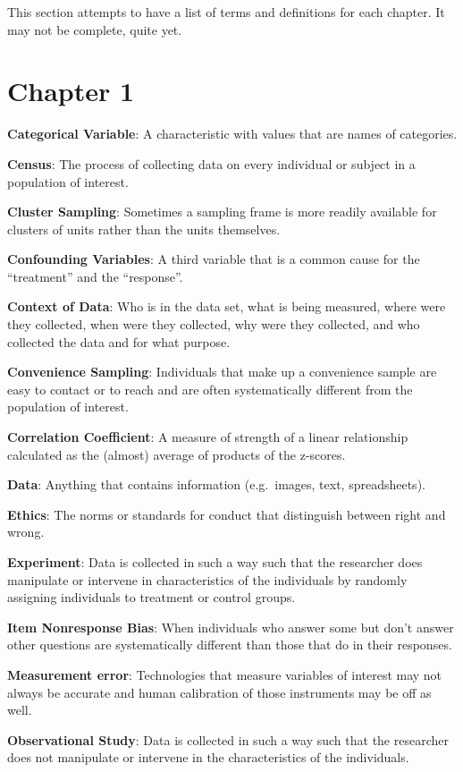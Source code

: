 \documentclass[
]{book}
\begin{document}
This section attempts to have a list of terms and definitions for each chapter. It may not be complete, quite yet.

\section{Chapter 1}\label{chapter-1}

\textbf{Categorical Variable}: A characteristic with values that are names of categories.

\textbf{Census}: The process of collecting data on every individual or subject in a population of interest.

\textbf{Cluster Sampling}: Sometimes a sampling frame is more readily available for clusters of units rather than the units themselves.

\textbf{Confounding Variables}: A third variable that is a common cause for the ``treatment'' and the ``response''.

\textbf{Context of Data}: Who is in the data set, what is being measured, where were they collected, when were they collected, why were they collected, and who collected the data and for what purpose.

\textbf{Convenience Sampling}: Individuals that make up a convenience sample are easy to contact or to reach and are often systematically different from the population of interest.

\textbf{Correlation Coefficient}: A measure of strength of a linear relationship calculated as the (almost) average of products of the z-scores.

\textbf{Data}: Anything that contains information (e.g.~images, text, spreadsheets).

\textbf{Ethics}: The norms or standards for conduct that distinguish between right and wrong.

\textbf{Experiment}: Data is collected in such a way such that the researcher does manipulate or intervene in characteristics of the individuals by randomly assigning individuals to treatment or control groups.

\textbf{Item Nonresponse Bias}: When individuals who answer some but don't answer other questions are systematically different than those that do in their responses.

\textbf{Measurement error}: Technologies that measure variables of interest may not always be accurate and human calibration of those instruments may be off as well.

\textbf{Observational Study}: Data is collected in such a way such that the researcher does not manipulate or intervene in the characteristics of the individuals.
\end{document}
